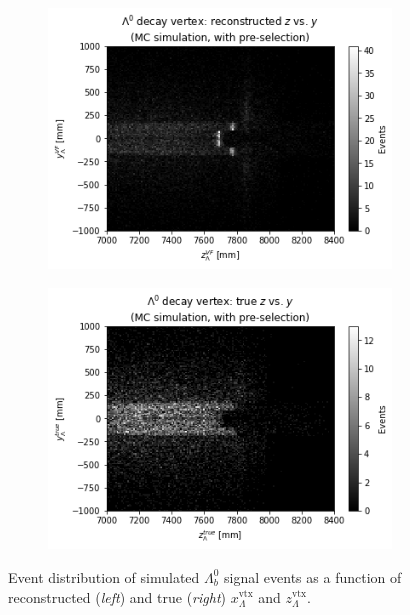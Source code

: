 \begin{figure}[t]
	\centering
	\begin{subfigure}{.45\textwidth}
		\includegraphics[width=\textwidth]{graphics/04-event_selection/Lambda_endvertex_z_vs_x.png}
		\caption{}
	\end{subfigure}
	\begin{subfigure}{.45\textwidth}
		\includegraphics[width=\textwidth]{graphics/04-event_selection/Lambda_endvertex_z_vs_x_true.png}
		\caption{}
	\end{subfigure}
	\caption[Event distribution of simulated $\Lambda_b^0$ signal events as a function of reconstructed and true $x_\Lambda^\text{vtx}$ and $z_\Lambda^\text{vtx}$.]{Event distribution of simulated $\Lambda_b^0$ signal events as a function of reconstructed (\textit{left}) and true (\textit{right}) $x_\Lambda^\text{vtx}$ and $z_\Lambda^\text{vtx}$.}
\end{figure}


